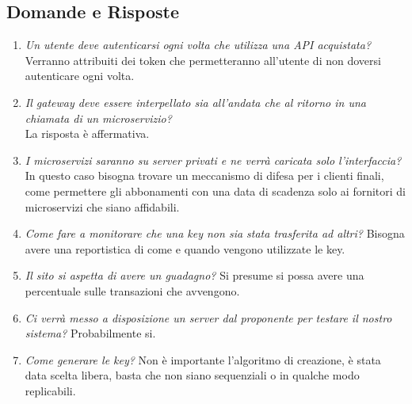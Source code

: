 \documentclass[12pt,a4paper,titlepage]{article}
\begin{document}
\subsection{Domande e Risposte}
\begin{enumerate}
	\item \textit{Un utente deve autenticarsi ogni volta che utilizza una API acquistata?}\\
	\hspace{35pt}Verranno attribuiti dei token che permetteranno all'utente di non doversi autenticare ogni volta.
	\item \textit{Il gateway deve essere interpellato sia all'andata che al ritorno in una chiamata di un microservizio?}\\
	\hspace{35pt}La risposta è affermativa.
	\item \textit{I microservizi saranno su server privati e ne verrà caricata solo l'interfaccia?}
	\hspace{35pt}In questo caso bisogna trovare un meccanismo di difesa per i clienti finali, come permettere gli abbonamenti con una data di scadenza solo ai fornitori di microservizi che siano affidabili.
	\item \textit{Come fare a monitorare che una key non sia stata trasferita ad altri?}
	\hspace{35pt}Bisogna avere una reportistica di come e quando vengono utilizzate le key.
	\item \textit{Il sito si aspetta di avere un guadagno?}
	\hspace{35pt}Si presume si possa avere una percentuale sulle transazioni che avvengono.
	\item \textit{Ci verrà messo a disposizione un server dal proponente per testare il nostro sistema?}
	\hspace{35pt}Probabilmente si.
	\item \textit{Come generare le key?}
	\hspace{35pt} Non è importante l'algoritmo di creazione, è stata data scelta libera, basta che non siano sequenziali o in qualche modo replicabili.
\end{enumerate}
\end{document}
